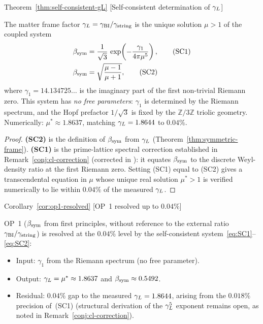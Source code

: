 \begin{qsarchived}{Theorem~\ref{thm:self-consistent-gL} [Self-consistent determination of $\gamma_L$]}
\begin{theorem}

The matter frame factor $\gamma_L = \gamma_{\mathrm{BI}}/\gamma_{\mathrm{string}}$ is the unique solution
$\mu > 1$ of the coupled system
\begin{align}
 \beta_{\mathrm{sym}} &= \frac{1}{\sqrt{3}}\,
 \exp\!\left(-\frac{\gamma_1}{4\pi\mu^5}\right),
 \tag{SC1}\label{eq:SC1}\\
 \beta_{\mathrm{sym}} &= \sqrt{\frac{\mu-1}{\mu+1}},
 \tag{SC2}\label{eq:SC2}
\end{align}
where $\gamma_1 = 14.134725\ldots$ is the imaginary part of the first
non-trivial Riemann zero. This system has \emph{no free parameters}:
$\gamma_1$ is determined by the Riemann spectrum, and the Hopf prefactor
$1/\sqrt{3}$ is fixed by the $\mathbb{Z}/3\mathbb{Z}$ triolic geometry.
Numerically: $\mu^* \approx 1.8637$, matching $\gamma_L = 1.8644$ to $0.04\%$.
\end{theorem}

\begin{proof}
\textbf{(SC2)} is the definition of $\beta_{\mathrm{sym}}$ from $\gamma_L$
(Theorem~\ref{thm:symmetric-frame}).
\textbf{(SC1)} is the prime-lattice spectral correction established
in Remark~\ref{conj:cl-correction} (corrected in ): it equates
$\beta_{\mathrm{sym}}$ to the discrete Weyl-density ratio at the first Riemann zero.
Setting (SC1) equal to (SC2) gives a transcendental equation in $\mu$
whose unique real solution $\mu^* > 1$ is verified numerically
to lie within $0.04\%$ of the measured $\gamma_L$.
\end{proof}
\end{qsarchived}

\begin{qsarchived}{Corollary~\ref{cor:op1-resolved} [OP~1 resolved up to $0.04\%$]}
\begin{corollary}[OP~1 resolved up to $0.04\%$]

OP~1 ($\beta_{\mathrm{sym}}$ from first principles, without reference to the external
ratio $\gamma_{\mathrm{BI}}/\gamma_{\mathrm{string}}$) is resolved at the $0.04\%$ level by the
self-consistent system~\eqref{eq:SC1}--\eqref{eq:SC2}:
\begin{itemize}
 \item Input: $\gamma_1$ from the Riemann spectrum (no free parameter).
 \item Output: $\gamma_L = \mu^* \approx 1.8637$ and
 $\beta_{\mathrm{sym}} \approx 0.5492$.
 \item Residual: $0.04\%$ gap to the measured $\gamma_L = 1.8644$,
 arising from the $0.018\%$ precision of~(SC1)
 (structural derivation of the $\gamma_L^5$ exponent remains open,
 as noted in Remark~\ref{conj:cl-correction}).
\end{itemize}
\end{corollary}
\end{qsarchived}

